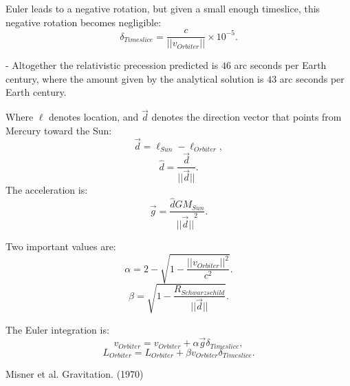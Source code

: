 \documentclass[12pt]{article}
\begin{document}
Euler leads to a negative rotation, but given a small enough timeslice, this negative rotation becomes negligible:
\begin{equation}
\delta_{Timeslice} = \frac{c}{\lvert\lvert v_{Orbiter} \rvert \rvert} \times 10^{-5}.
\end{equation}




- Altogether the relativistic precession predicted is $46$ arc seconds per Earth century, where the amount given by the analytical solution is $43$ arc seconds per Earth century.

Where $\ell$ denotes location, and $\vec{d}$ denotes the direction vector that points from Mercury toward the Sun:
\begin{equation}
\vec{d} = \ell_{Sun} - \ell_{Orbiter},	
\end{equation}
\begin{equation}
\hat{d} = \frac{\vec{d}}{\lvert\lvert \vec{d} \rvert\rvert}.
\end{equation}
The acceleration is:
\begin{equation}
\vec{g} =  \frac{\hat{d} G M_{Sun}}{{\lvert\lvert \vec{d} \rvert\rvert}^2}.
\end{equation}


Two important values are:
\begin{equation}
\alpha = 2 - \sqrt{1 - \frac{\lvert\lvert v_{Orbiter}\rvert\rvert^2}{c^2}}.
\end{equation}
\begin{equation}
\beta = \sqrt{1 - \frac{R_{Schwarzschild}}{\lvert \lvert \vec{d} \rvert \rvert}}.
\end{equation}

The Euler integration is:
\begin{equation}
v_{Orbiter} = v_{Orbiter} + \alpha \vec{g} \delta_{Timeslice},
\end{equation}
\begin{equation}
L_{Orbiter} = L_{Orbiter} + \beta v_{Orbiter} \delta_{Timeslice}.
\end{equation}






\begin{thebibliography}{9}


 Misner et al. Gravitation. (1970)






\end{thebibliography}
\end{document}
